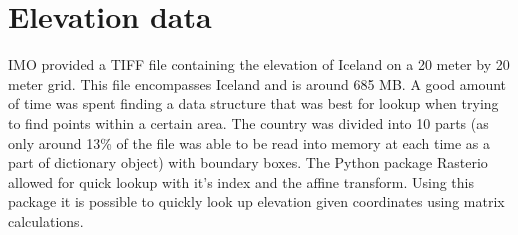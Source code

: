 \section{Elevation data}
IMO provided a TIFF file containing the elevation of Iceland on a 20 meter by 20 meter grid. This file encompasses Iceland and is around 685 MB. A good amount of time was spent finding a data structure that was best for lookup when trying to find points within a certain area. The country was divided into 10 parts (as only around 13\% of the file was able to be read into memory at each time as a part of dictionary object) with boundary boxes. The Python package Rasterio allowed for quick lookup with it's index and the affine transform. Using this package it is possible to quickly look up elevation given coordinates using matrix calculations.